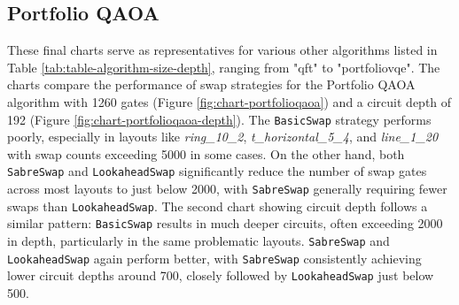 \subsection{Portfolio QAOA}
These final charts serve as representatives for various other algorithms listed in Table \ref{tab:table-algorithm-size-depth}, ranging from "qft" to "portfoliovqe". The charts compare the performance of swap strategies for the Portfolio QAOA algorithm with 1260 gates (Figure \ref{fig:chart-portfolioqaoa}) and a circuit depth of 192 (Figure \ref{fig:chart-portfolioqaoa-depth}). The \lstinline{BasicSwap} strategy performs poorly, especially in layouts like \textit{ring\_10\_2}, \textit{t\_horizontal\_5\_4}, and \textit{line\_1\_20} with swap counts exceeding 5000 in some cases. On the other hand, both \lstinline{SabreSwap} and \lstinline{LookaheadSwap} significantly reduce the number of swap gates across most layouts to just below 2000, with \lstinline{SabreSwap} generally requiring fewer swaps than \lstinline{LookaheadSwap}. The second chart showing circuit depth follows a similar pattern: \lstinline{BasicSwap} results in much deeper circuits, often exceeding 2000 in depth, particularly in the same problematic layouts. \lstinline{SabreSwap} and \lstinline{LookaheadSwap} again perform better, with \lstinline{SabreSwap} consistently achieving lower circuit depths around 700, closely followed by \lstinline{LookaheadSwap} just below 500.
